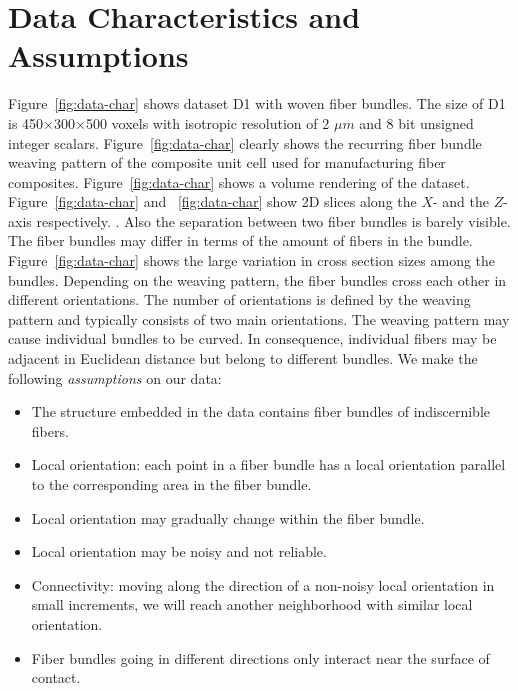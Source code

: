 \section {Data Characteristics and Assumptions}
\label{sec:char_data}
Figure~\ref{fig:data-char} shows dataset D1 with woven fiber bundles. The size of D1 is 450$\times$300$\times$500 voxels with isotropic resolution of 2 $\mu m$ and 8 bit unsigned integer scalars. Figure~\ref{fig:data-char} clearly shows the recurring fiber bundle weaving pattern of the composite unit cell used for manufacturing fiber composites. Figure~\ref{fig:data-char} shows a volume rendering of the dataset. Figure~\ref{fig:data-char} and ~\ref{fig:data-char} show 2D slices along the $X$- and the $Z$-axis respectively. . Also the separation between two fiber bundles is barely visible. The fiber bundles may differ in terms of the amount of fibers in the bundle. Figure~\ref{fig:data-char} shows the large variation in cross section sizes among the bundles.
Depending on the weaving pattern, the fiber bundles cross each other in different orientations. The number of orientations is defined by the weaving pattern and typically consists of two main orientations. The weaving pattern may cause individual bundles to be curved. In consequence, individual fibers may be adjacent in Euclidean distance but belong to different bundles. 
We make the following \textit{assumptions} on our data:

\begin{itemize}[noitemsep]
\item The structure embedded in the data contains fiber bundles of indiscernible fibers.
\item Local orientation: each point in a fiber bundle has a local orientation parallel to the corresponding area in the fiber bundle.
\item Local orientation may gradually change within the fiber bundle.
\item Local orientation may be noisy and not reliable.
\item Connectivity: moving along the direction of a non-noisy local orientation in small increments, we will reach another neighborhood with similar local orientation.
\item Fiber bundles going in different directions only interact near the surface of contact.
\end{itemize}